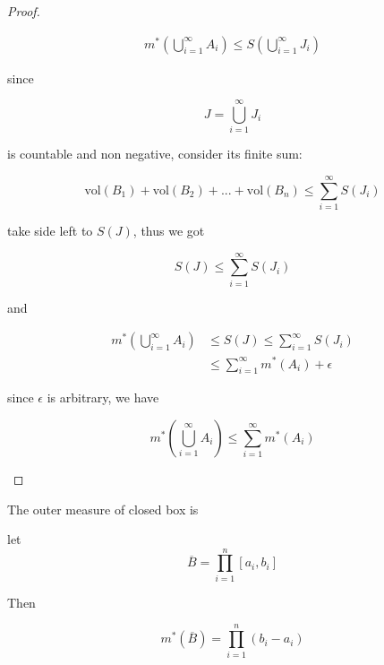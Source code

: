 \begin{proof}
\begin{enumerate}
        \begin{align*}
            m^*\left(\bigcup_{i=1}^{\infty}A_i \right) \le S\left(\bigcup_{i=1}^{\infty} J_i \right)
        \end{align*}

        since 

        \[
            J = \bigcup_{i=1}^{\infty} J_i
        \]

        is countable and non negative, consider its finite sum:

        \[
            \mathrm{vol}(B_1) +\mathrm{vol}(B_2) + ... + \mathrm{vol}(B_n) \le \sum_{i=1}^{\infty}S(J_i)
        \]

        take side left to $S(J)$, thus we got

        \[
            S(J) \le \sum_{i=1}^{\infty}S(J_i)
        \]

        and


        \begin{align*}
            m^*\left(\bigcup_{i=1}^{\infty}A_i \right) & \le S(J) \le \sum_{i=1}^{\infty}S(J_i) \\
            & \le \sum_{i=1}^{\infty}m^*(A_i) + \epsilon
        \end{align*}

        since $\epsilon$ is arbitrary, we have

        \[
m^*\left(\bigcup_{i=1}^{\infty}A_i \right) \le \sum_{i=1}^{\infty}m^*(A_i)
        \]
    \end{enumerate}
\end{proof}

\begin{thm}
    The outer measure of closed box is 

    let
    \[
        \overline{B} = \prod_{i=1}^{n}[a_i,b_i]
    \]

    Then

    \[
        m^*(\overline{B}) = \prod_{i=1}^{n}(b_i - a_i)
    \]
\end{thm}


